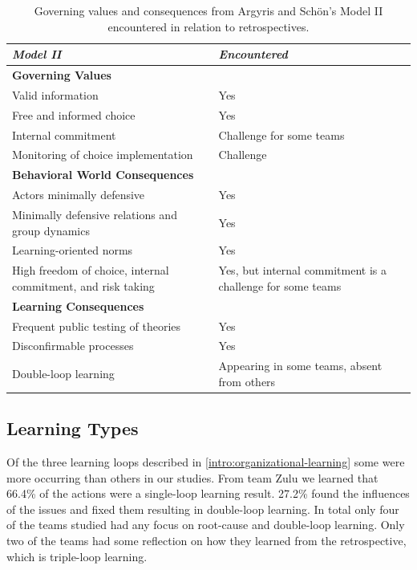 \begin{table}[h]
	\begin{center}
		\caption{Governing values and consequences from Argyris and Schön's Model II encountered in relation to retrospectives.}
		\label{table:model-ii-occurences}
		\begin{tabular}{p{} p{}}
			\hline
			\textit{Model II} & \textit{Encountered} \\
			\hline
			\textbf{Governing Values} & \\
			Valid information & Yes \\
			Free and informed choice & Yes \\
			Internal commitment & Challenge for some teams \\
			Monitoring of choice implementation & Challenge \\
			\hline
			\textbf{Behavioral World Consequences} & \\
			Actors minimally defensive & Yes \\
			Minimally defensive relations and group dynamics & Yes \\
			Learning-oriented norms & Yes \\
			High freedom of choice, internal commitment, and risk taking & Yes, but internal commitment is a challenge for some teams \\
			\hline
			\textbf{Learning Consequences} & \\
			Frequent public testing of theories & Yes \\
			Disconfirmable processes & Yes \\
			Double-loop learning & Appearing in some teams, absent from others \\
			\hline
		\end{tabular}
	\end{center}
\end{table}

\subsection{Learning Types}
\label{discussion:learning-types}
Of the three learning loops described in \autoref{intro:organizational-learning} some were more occurring than others in our studies. From team Zulu we learned that 66.4\% of the actions were a single-loop learning result. 27.2\% found the influences of the issues and fixed them resulting in double-loop learning. In total only four of the teams studied had any focus on root-cause and double-loop learning. Only two of the teams had some reflection on how they learned from the retrospective, which is triple-loop learning.

